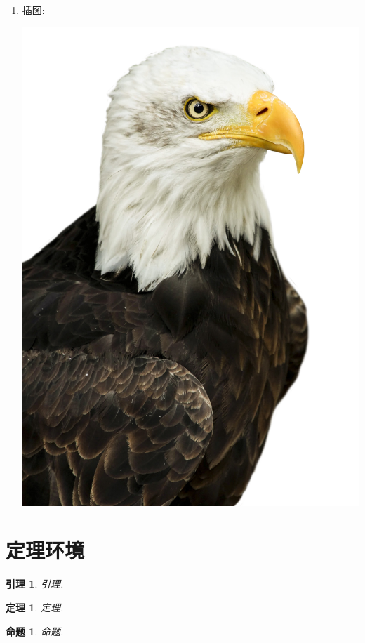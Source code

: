 \documentclass[a4paper, 11pt, UTF8]{article}
\theoremstyle{plain}
\newtheorem{thm}{定理}[section]
\newtheorem{lem}{引理}[section]
\newtheorem{prop}{命题}[section]
\theoremstyle{definition}
\theoremstyle{remark}
\begin{document}
\begin{enumerate}[1、]
		\item 插图:
			\begin{center}
			 	\includegraphics[scale=0.1]{1.png}	
			\end{center}	
	\end{enumerate}

	\section{定理环境}
	
	\begin{lem}
		引理.
	\end{lem}

	\begin{thm}
		定理.
	\end{thm}

	\begin{prop}
		命题.
	\end{prop}
\end{document}
